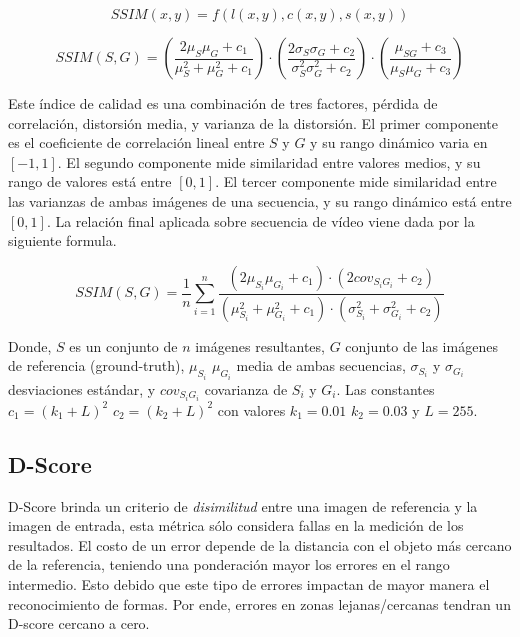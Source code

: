 \begin{equation}
SSIM(x,y) = f(l(x,y), c(x,y),s(x,y)) 
\end{equation}

\begin{equation}
SSIM(S,G) = (\frac{2\mu_S\mu_G + c_1}{\mu_S^2 + \mu_G^2 + c_1}) \cdot (\frac{2\sigma_S\sigma_G + c_2}{\sigma_S^2\sigma_G^2 + c_2}) \cdot (\frac{\mu_{SG} + c_3}{\mu_S\mu_G + c_3})
\end{equation}

Este índice de calidad es una combinación de tres factores, pérdida de correlación, distorsión media, y varianza de la distorsión. El primer componente es el coeficiente de correlación lineal entre $S$ y $G$ y su rango dinámico varia en $[-1,1]$. El segundo componente mide similaridad entre valores medios, y su rango de valores está entre $[0,1]$. El tercer componente mide similaridad entre las varianzas de ambas imágenes de una secuencia, y su rango dinámico está entre $[0,1]$. La relación final aplicada sobre secuencia de vídeo viene dada por la siguiente formula. 


\begin{equation}
SSIM(S,G) = \frac{1}{n} \sum_{i=1}^{n} \frac{(2\mu_{S_{i}} \mu_{G_{i}} + c_1) \cdot (2 cov_{S_iG_i} + c_2)}  {(\mu^2_{S_i} + \mu^2_{G_i} + c_1) \cdot (\sigma^2_{S_i} + \sigma^2_{G_i} + c_2)}
\end{equation}

Donde, $S$ es un conjunto de $n$ imágenes resultantes, $G$ conjunto de las imágenes de referencia (ground-truth), $\mu_{S_i}$ $\mu_{G_i}$ media de ambas secuencias, $\sigma_{S_i}$ y $\sigma_{G_i}$ desviaciones estándar, y $cov_{S_iG_i}$ covarianza de $S_i$ y $G_i$. Las constantes $c_1 = (k_1 + L)^2$ $c_2=(k_2 + L)^2$ con valores $k_1=0.01$ $k_2=0.03$ y $L=255$.


\subsection{D-Score}
D-Score brinda un criterio de \emph{disimilitud} entre una imagen de referencia y la imagen de entrada, esta métrica sólo considera fallas en la medición de los resultados. El costo de un error depende de la distancia con el objeto más cercano de la referencia, teniendo una ponderación mayor los errores en el rango intermedio. Esto debido que este tipo de errores impactan de mayor manera el reconocimiento de formas. Por ende, errores en zonas lejanas/cercanas tendran un D-score cercano a cero. 

